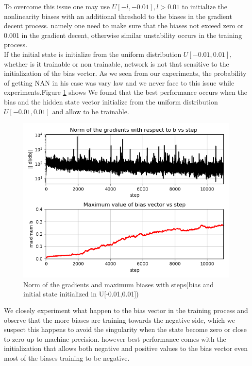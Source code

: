 \documentclass[letterpaper]{article} %
\begin{document}
\noindent To overcome this issue one may use $U[-l,-0.01], l > 0.01$ to initialize the nonlinearity biases with an additional threshold to the biases in the gradient decent process. namely one need to make sure that the biases not exceed zero or 0.001 in the gradient decent, otherwise similar unstability occurs in the training process. \\

\noindent If the initial state is initialize from the uniform distribution $U[-0.01,0.01]$, whether is it trainable or non trainable, network is not that sensitive to the initialization of the bias vector. As we seen from our experiments, the probability of getting NAN in his case was vary law and we never face to this issue while experiments.Figure \ref{fig_modrelu2} shows We found that the best performance occurs when the bias and the hidden state vector initialize from the uniform distribution $U[-0.01,0.01]$ and allow to be trainable.\\

\begin{figure}
\centering
\includegraphics[width=0.8\linewidth]{ModRelu2.png}
  \caption{Norm of the gradients and maximum biases with steps(bias and initial state initialized in U[-0.01,0.01])}
  \label{fig_modrelu2}
\end{figure}

\noindent We closely experiment what happen to the bias vector in the training process and observe that the more biases are training towards the negative side, which we suspect this happens to avoid the singularity when the state become zero or close to zero up to machine precision. however best performance comes with the initialization that allows both negative and positive values to the bias vector even most of the biases training to be negative.  
\end{document}
